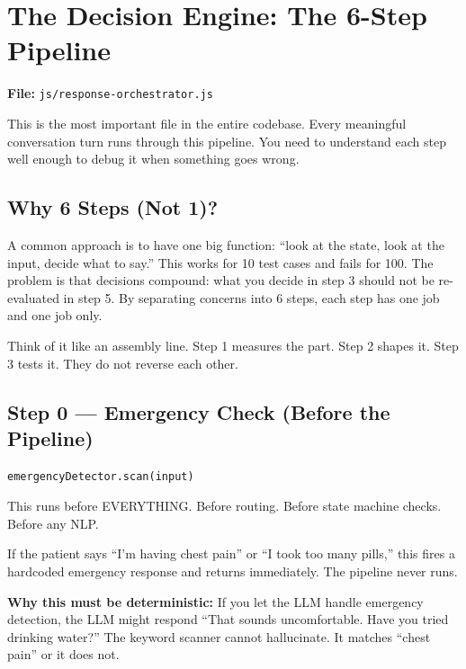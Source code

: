 \documentclass[12pt, a4paper]{report}
\newcommand{\ic}[1]{\texttt{\small\color{accentblue!70!black}#1}}
\begin{document}
\chapter{The Decision Engine: The 6-Step Pipeline}

\textbf{File:} \ic{js/response-orchestrator.js}

This is the most important file in the entire codebase. Every meaningful conversation
turn runs through this pipeline. You need to understand each step well enough to debug
it when something goes wrong.

\section{Why 6 Steps (Not 1)?}

A common approach is to have one big function: ``look at the state, look at the input,
decide what to say.'' This works for 10 test cases and fails for 100. The problem is
that decisions compound: what you decide in step 3 should not be re-evaluated in step 5.
By separating concerns into 6 steps, each step has one job and one job only.

Think of it like an assembly line. Step 1 measures the part. Step 2 shapes it. Step 3
tests it. They do not reverse each other.

\section{Step 0 --- Emergency Check (Before the Pipeline)}

\begin{lstlisting}
emergencyDetector.scan(input)
\end{lstlisting}

This runs before EVERYTHING. Before routing. Before state machine checks. Before any NLP.

If the patient says ``I'm having chest pain'' or ``I took too many pills,'' this fires a
hardcoded emergency response and returns immediately. The pipeline never runs.

\begin{alertbox}
  \textbf{Why this must be deterministic:} If you let the LLM handle emergency
  detection, the LLM might respond ``That sounds uncomfortable. Have you tried drinking
  water?'' The keyword scanner cannot hallucinate. It matches ``chest pain'' or it does
  not.
\end{alertbox}
\end{document}
